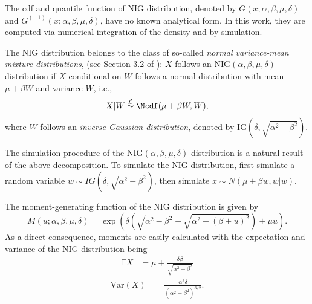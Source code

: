 The cdf and quantile function of NIG distribution, denoted by $G(x; \alpha, \beta, \mu, \delta)$ and $G^{(-1)}(x; \alpha, \beta, \mu, \delta)$,
 have no known analytical form.
 In this work, they are computed via numerical integration of the density and by simulation.

The NIG distribution belongs to
the class of so-called {\em normal
variance-mean mixture distributions},  (see Section 3.2 of 
\citet{McNeil2005}): $X$ follows an
$\text{NIG}(\alpha,\beta,\mu,\delta)$ distribution if $X$ conditional
on $W$ follows a normal distribution with mean $\mu+\beta W$ and
variance $W$, i.e., 
\begin{equation*}
  X|W\stackrel{\mathcal L}\sim \Ncdf(\mu + \beta W, W),
\end{equation*}
where $W$ follows an {\em inverse Gaussian distribution}, denoted by
$\text{IG}(\delta, \sqrt{\alpha^2-\beta^2})$.

The simulation procedure of the NIG$(\alpha, \beta, \mu, \delta)$
distribution is a natural result of the above decomposition.  
To simulate the NIG distribution, first simulate a random variable $w \sim IG(\delta, \sqrt{\alpha^2-\beta^2})$, 
then simulate $x \sim N(\mu+ \beta w, w|w)$. 

The moment-generating function of the NIG distribution is given by
\begin{equation*}
  M(u; \alpha, \beta, \mu, \delta) = \exp\left( \delta
    \left(\sqrt{\alpha^2-\beta^2} - \sqrt{\alpha^2 - (\beta +
        u)^2}\right) + \mu u\right). 
\end{equation*}
As a direct consequence, moments are easily calculated with the
expectation and variance of the NIG distribution being
\begin{align*}
  \mathbb E X &= \mu +
                \frac{\delta \beta}{\sqrt{\alpha^2-\beta^2}}
  \end{align*}
\begin{align} \label{eq:5}
  \text{Var}(X) &= \frac{\alpha^2\delta}{(\alpha^2-\beta^2)^{3/2}}.
\end{align}

